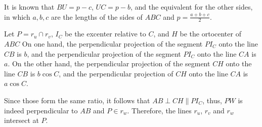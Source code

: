It is known that $BU = p - c$, $UC = p - b$, and the equivalent for the other sides, in which $a, b, c$ are the lengths of the sides of $ABC$ and $p = \tfrac{a+b+c}{2}$.

Let $P = r_u \cap r_v$, $I_C$ be the excenter relative to $C$, and $H$ be the ortocenter of $ABC$
On one hand, the perpendicular projection of the segment $PI_C$ onto the line $CB$ is $b$, and the perpendicular projection of the segment $PI_C$ onto the line $CA$ is $a$. On the other hand, the perpendicular projection of the segment $CH$ onto the line $CB$ is $b\cos C$, and the perpendicular projection of $CH$ onto the line $CA$ is $a\cos C$.

Since those form the same ratio, it follows that $AB \perp CH \parallel PI_C$, thus, $PW$ is indeed perpendicular to $AB$ and $P \in r_w$. Therefore, the lines $r_u$, $r_v$ and $r_w$ intersect at $P$.
